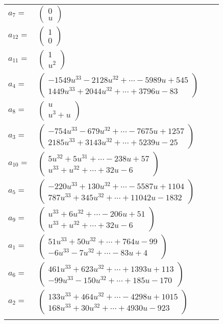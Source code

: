 \documentclass[1p]{elsarticle_modified}
\theoremstyle{definition}
\begin{document}
\begin{tabular}{m{7pt} m{180pt} m{7pt} m{180pt} }
\flushright $a_{7}=$&$\begin{pmatrix}0\\u\end{pmatrix}$ \\
\flushright $a_{12}=$&$\begin{pmatrix}1\\0\end{pmatrix}$ \\
\flushright $a_{11}=$&$\begin{pmatrix}1\\u^2\end{pmatrix}$ \\
\flushright $a_{4}=$&$\begin{pmatrix}-1549 u^{33}-2128 u^{32}+\cdots-5989 u+545\\1449 u^{33}+2044 u^{32}+\cdots+3796 u-83\end{pmatrix}$ \\
\flushright $a_{8}=$&$\begin{pmatrix}u\\u^3+u\end{pmatrix}$ \\
\flushright $a_{3}=$&$\begin{pmatrix}-754 u^{33}-679 u^{32}+\cdots-7675 u+1257\\2185 u^{33}+3143 u^{32}+\cdots+5239 u-25\end{pmatrix}$ \\
\flushright $a_{10}=$&$\begin{pmatrix}5 u^{32}+5 u^{31}+\cdots-238 u+57\\u^{33}+u^{32}+\cdots+32 u-6\end{pmatrix}$ \\
\flushright $a_{5}=$&$\begin{pmatrix}-220 u^{33}+130 u^{32}+\cdots-5587 u+1104\\787 u^{33}+345 u^{32}+\cdots+11042 u-1832\end{pmatrix}$ \\
\flushright $a_{9}=$&$\begin{pmatrix}u^{33}+6 u^{32}+\cdots-206 u+51\\u^{33}+u^{32}+\cdots+32 u-6\end{pmatrix}$ \\
\flushright $a_{1}=$&$\begin{pmatrix}51 u^{33}+50 u^{32}+\cdots+764 u-99\\-6 u^{33}-7 u^{32}+\cdots-83 u+4\end{pmatrix}$ \\
\flushright $a_{6}=$&$\begin{pmatrix}461 u^{33}+623 u^{32}+\cdots+1393 u+113\\-99 u^{33}-150 u^{32}+\cdots+185 u-170\end{pmatrix}$ \\
\flushright $a_{2}=$&$\begin{pmatrix}133 u^{33}+464 u^{32}+\cdots-4298 u+1015\\168 u^{33}+30 u^{32}+\cdots+4930 u-923\end{pmatrix}$\\&\end{tabular}
\end{document}

